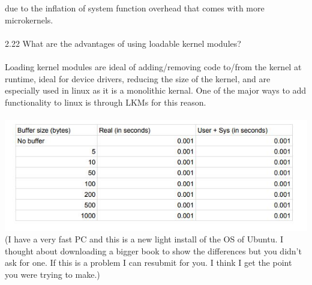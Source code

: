\documentclass[12pt]{article}
\begin{document}
due to the inflation of system function overhead that comes with 
more microkernels.\\\\
2.22 What are the advantages of using loadable kernel modules?\\\\
Loading kernel modules are ideal of adding/removing code to/from 
the kernel at runtime, ideal for device drivers, reducing the size of 
the kernel, and are especially used in linux as it is a monolithic kernal.
One of the major ways to add functionality to linux is through LKMs for 
this reason.
\\\\
\includegraphics{table.jpg}\\
(I have a very fast PC and this is a new light install of the OS of 
Ubuntu. I thought about downloading a bigger book to show the 
differences but you didn't ask for one. If this is a problem 
I can resubmit for you. I think I get the point you were 
trying to make.)
\end{document}
